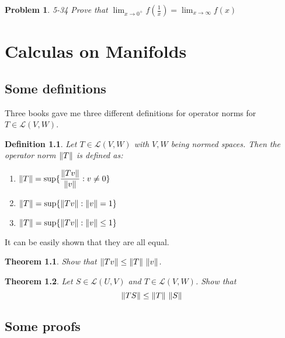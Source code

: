 \documentclass[12pt]{book}
\newcommand\T{\rule{0pt}{2.6ex}}
\newcommand\B{\rule[-1.2ex]{0pt}{0pt}}
\newtheorem{theorem}{Theorem}
\newtheorem*{problem*}{Problem}
\newtheorem*{definition*}{Definition}
\begin{document}
\begin{problem*}
  \T\B 5-34 Prove that $\lim_{x \to 0^+}f(\frac{1}{x}) = \lim_{x \to \infty} f(x)$
\end{problem*}

\chapter{Calculas on Manifolds}
\section{Some definitions}
Three books gave me three different definitions for operator norms for $T \in  \mathcal{L} (V, W)$.

\begin{definition*}
  Let $T \in \mathcal{L}(V,W)$ with $V,W$ being normed spaces. Then the operator norm $\norm{T}$ is defined as: 
  \begin{enumerate}
  \item $\norm{T} = \sup \{ \displaystyle\frac{\norm{Tv}}{\norm{v}} :  v \ne 0 \}$
  \item $\norm{T} = \sup \{ \norm{Tv} :  \norm{v} = 1 \}$
  \item $\norm{T} = \sup \{ \norm{Tv} :  \norm{v} \le 1 \}$
  \end{enumerate}
\end{definition*}

\T\B It can be easily shown that they are all equal.

\begin{theorem}
  Show that $\norm{Tv} \le \norm{T}\ \norm{v}$.
\end{theorem}

\begin{theorem}
  Let $S \in \mathcal{L}(U, V)$ and $T \in \mathcal{L}(V, W)$. Show that
  \[
  \norm{TS} \le \norm{T}\ \norm{S}
  \]
\end{theorem}

\section{Some proofs}
% 
\end{document}

